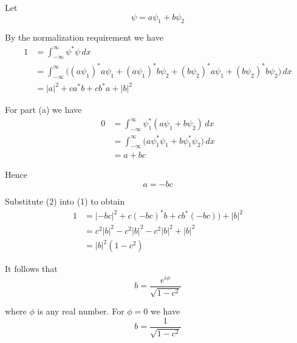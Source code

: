 


\bigskip
Let
\begin{equation*}
\psi=a\psi_1+b\psi_2
\end{equation*}

By the normalization requirement we have
\begin{align*}
1&=\int_{-\infty}^\infty\psi^*\psi\,dx
\\
&=\int_{-\infty}^\infty
\bigl(
(a\psi_1)^*a\psi_1
+(a\psi_1)^*b\psi_2
+(b\psi_2)^*a\psi_1
+(b\psi_2)^*b\psi_2
\bigr)\,dx
\\
&=|a|^2+ca^*b+cb^*a+|b|^2\tag{1}
\end{align*}

For part (a) we have
\begin{align*}
0&=\int_{-\infty}^\infty
\psi_1^*(a\psi_1+b\psi_2)\,dx
\\
&=\int_{-\infty}^\infty
\bigl(
a\psi_1^*\psi_1+b\psi_1^*\psi_2
\bigr)\,dx
\\
&=a+bc
\end{align*}

Hence
\begin{equation*}
a=-bc
\tag{2}
\end{equation*}

Substitute (2) into (1) to obtain
\begin{align*}
1&=|{-bc}|^2+c(-bc)^*b+cb^*(-bc))+|b|^2
\\
&=c^2|b|^2-c^2|b|^2-c^2|b|^2+|b|^2
\\
&=|b|^2(1-c^2)
\end{align*}

It follows that
\begin{equation*}
b=\frac{e^{i\phi}}{\sqrt{1-c^2}}
\end{equation*}

where $\phi$ is any real number.
For $\phi=0$ we have
\begin{equation*}
b=\frac{1}{\sqrt{1-c^2}}
\end{equation*}

